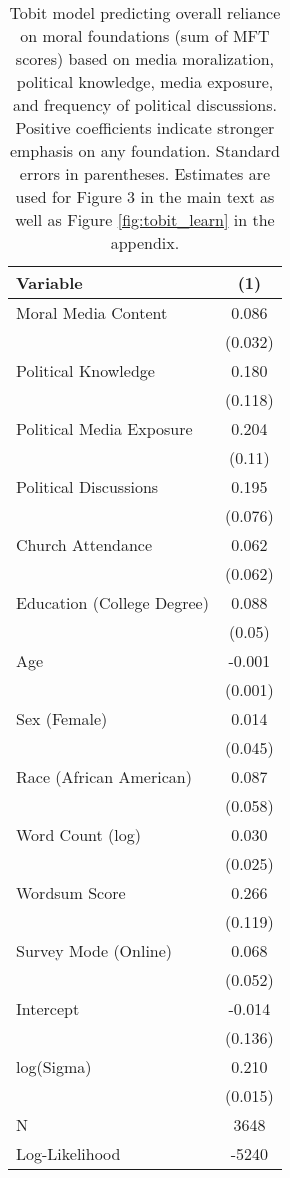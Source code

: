 \begin{table}[ht]
\centering
\caption{Tobit model predicting overall reliance on moral foundations
           (sum of MFT scores) based on media moralization, political knowledge, media exposure, and frequency of 
           political discussions. Positive coefficients indicate stronger emphasis on any foundation.
           Standard errors in parentheses. Estimates are used for Figure 3 in 
           the main text as well as Figure \ref{fig:tobit_learn} in the appendix.} 
\label{tab:tobit_learn}
\begingroup\footnotesize
\begin{tabular}{lc}
  \hline
Variable & (1) \\ 
  \hline
Moral Media Content &  0.086 \\ 
   & (0.032) \\ 
  Political Knowledge &  0.180 \\ 
   & (0.118) \\ 
  Political Media Exposure &  0.204 \\ 
   & (0.11) \\ 
  Political
Discussions &  0.195 \\ 
   & (0.076) \\ 
  Church Attendance &  0.062 \\ 
   & (0.062) \\ 
  Education (College Degree) &  0.088 \\ 
   & (0.05) \\ 
  Age & -0.001 \\ 
   & (0.001) \\ 
  Sex (Female) &  0.014 \\ 
   & (0.045) \\ 
  Race (African American) &  0.087 \\ 
   & (0.058) \\ 
  Word Count (log) &  0.030 \\ 
   & (0.025) \\ 
  Wordsum Score &  0.266 \\ 
   & (0.119) \\ 
  Survey Mode (Online) &  0.068 \\ 
   & (0.052) \\ 
  Intercept & -0.014 \\ 
   & (0.136) \\ 
  log(Sigma) &  0.210 \\ 
   & (0.015) \\ 
   \hline
N & 3648 \\ 
  Log-Likelihood & -5240 \\ 
   \hline
\end{tabular}
\endgroup
\end{table}
